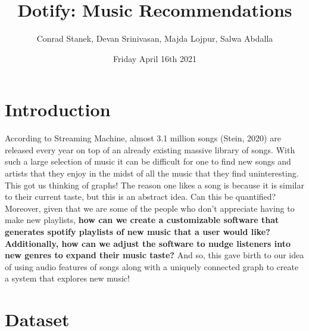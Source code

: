 \documentclass[fontsize=11pt]{article}
\title{Dotify: Music Recommendations}
\author{Conrad Stanek, Devan Srinivasan, Majda Lojpur, Salwa Abdalla}
\date{Friday April 16th 2021}
\begin{document}
    

    \maketitle
    \section*{Introduction}
    According to Streaming Machine, almost 3.1 million songs (Stein, 2020) are released every year on top of an already existing massive library of songs. With such a large selection of music it can be difficult for one to find new songs and artists that they enjoy in the midst of all the music that they find uninteresting. This got us thinking of graphs! The reason one likes a song is because it is similar to their current taste, but this is an abstract idea. Can this be quantified? Moreover, given that we are some of the people who don't appreciate having to make new playlists, \textbf{how can we create a customizable software that generates spotify playlists of new music that a user would like? Additionally, how can we adjust the software to nudge listeners into new genres to expand their music taste?} And so, this gave birth to our idea of using audio features of songs along with a uniquely connected graph to create a system that explores new music!

    \section*{Dataset}

    \begin{comment}
        (if applicable) The name and description of all datasets you used for your project. If your program generates its own datasets, you should describe those as well. Include the format and source of each dataset.

        Also state which parts of each dataset (e.g., which columns in a csv file) are actually used by your program. (When using large datasets, it is common to use only a subset of the data found within them.)

        You do not need to submit sample dataset files to MarkUs.
    \end{comment}
\end{document}
